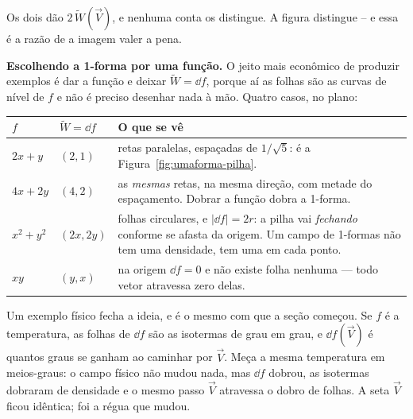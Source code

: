 \documentclass[12pt,a4paper,oneside]{book}
\theoremstyle{rgplain}
\theoremstyle{rgremark}
\begin{document}
Os dois dão $2\,\tilde W(\vec V)$, e nenhuma conta os distingue. A figura distingue --
e essa é a razão de a imagem valer a pena.

\textbf{Escolhendo a 1-forma por uma função.} O jeito mais econômico de
produzir exemplos é dar a função e deixar $\tilde W=\dd f$, porque aí as folhas
são as curvas de nível de $f$ e não é preciso desenhar nada à mão. Quatro
casos, no plano:

\begin{center}
\small
\begin{tabular}{llp{6.9cm}}
\toprule
$f$ & $\tilde W=\dd f$ & O que se vê \\
\midrule
$2x+y$ & $(2,1)$ &
retas paralelas, espaçadas de $1/\sqrt5$: é a
Figura~\ref{fig:umaforma-pilha}. \\
$4x+2y$ & $(4,2)$ &
as \emph{mesmas} retas, na mesma direção, com metade do espaçamento. Dobrar a
função dobra a 1-forma. \\
$x^2+y^2$ & $(2x,2y)$ &
folhas circulares, e $|\dd f|=2r$: a pilha vai \emph{fechando} conforme se
afasta da origem. Um campo de 1-formas não tem uma densidade, tem uma em
cada ponto. \\
$xy$ & $(y,x)$ &
na origem $\dd f=0$ e não existe folha nenhuma --- todo vetor atravessa zero
delas. \\
\bottomrule
\end{tabular}
\end{center}

Um exemplo físico fecha a ideia, e é o mesmo com que a seção começou. Se $f$ é
a temperatura, as folhas de $\dd f$ são as isotermas de grau em grau, e
$\dd f(\vec V)$ é quantos graus se ganham ao caminhar por $\vec V$. Meça a mesma
temperatura em meios-graus: o campo físico não mudou nada, mas $\dd f$ dobrou,
as isotermas dobraram de densidade e o mesmo passo $\vec V$ atravessa o dobro
de folhas. A seta $\vec V$ ficou idêntica; foi a régua que mudou.
\end{document}
